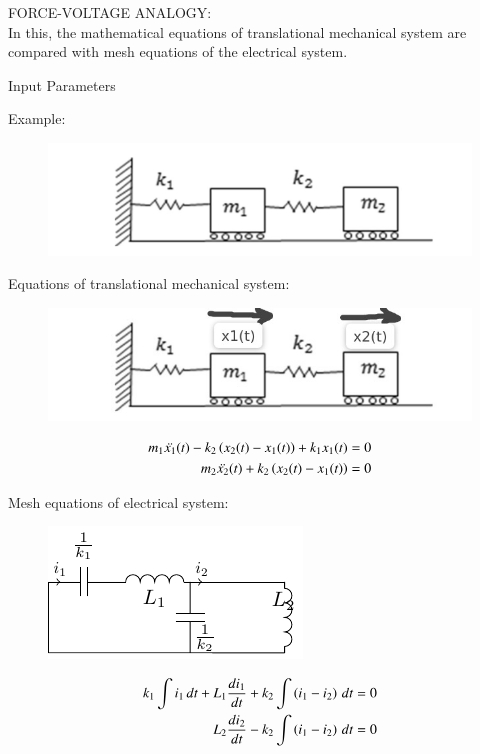 \documentclass[journal,12pt,onecolumn]{IEEEtran}
\theoremstyle{remark}
\begin{document}
FORCE-VOLTAGE ANALOGY:\\
In this, the mathematical equations of translational mechanical system are compared with mesh equations of the electrical system.


\begin{table}[!ht]    
    \centering
      
      \caption{Input Parameters}
    \label{table:ishitha.g22.nm.54.at1}
\end{table}


Example: 
\begin{figure}[!ht]
    \centering
    \includegraphics[scale=0.5]{figs/g54.fig1.png}
    \caption{ }
    \label{fig:ishitha.g22.nm.54.f1}
\end{figure}  


Equations of translational mechanical system:\\

\begin{figure}[!ht]
    \centering
    \includegraphics[scale=0.5]{figs/g54.fig2.jpeg}
    \caption{ }
    \label{fig:ishitha.g22.nm.54.f2}
\end{figure} 


\begin{align}
m_1\ddot{x_1}(t) - k_2\left(x_2(t)-x_1(t)\right)+ k_1x_1(t)&=0
\label{eq:ishitha.g22.nm.54.1.eq}\\
m_2\ddot{x_2}(t) + k_2\left(x_2(t)-x_1(t)\right)&=0
\label{eq:ishitha.g22.nm.54.2.eq} 
\end{align}

Mesh equations of electrical system:\\   

\begin{figure}[!ht]
    \centering
    \includegraphics[scale=1.5]{figs/tikz.pdf}
    \caption{ }
    \label{fig:ishitha.g22.nm.54.f3}
\end{figure}   
\begin{align}
 k_1\int i_1 \, dt + L_1\frac{di_1}{dt}+k_2\int \left(i_1-i_2\right) \, dt &=0\\
 L_2\frac{di_2}{dt}-k_2\int \left(i_1-i_2\right) \, dt &=0
\end{align}    
\end{document}
